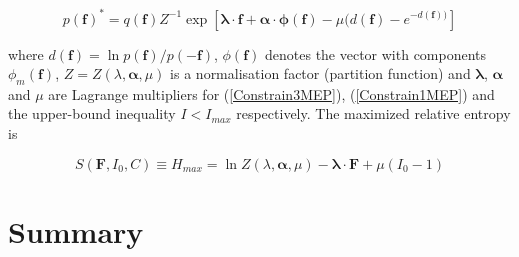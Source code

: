 \documentclass[a4paper,12pt]{article}
\begin{document}
\begin{equation}
  p(\bm{f})^* = q( \bm{f} ) Z^{-1} \exp[\bm{\lambda} \cdot \bm{f}+ \bm{\alpha} \cdot \bm{\phi} (\bm{f}) - \mu ( d(\bm{f}) - e^{-d(\bm{f}))}]
\end{equation}

where $d(\bm{f})= \ln{p(\bm{f})/p(-\bm{f})}$, $\phi(\bm{f})$ denotes the vector with components $\phi_m(\bm{f})$, $Z = Z(\lambda, \bm{\alpha},\mu)$ is a normalisation factor (partition function) and $\bm{\lambda}$, $\bm{\alpha}$ and $\mu$ are Lagrange multipliers for (\ref{Constrain3MEP}), (\ref{Constrain1MEP}) and the upper-bound inequality $I<I_{max}$ respectively. The maximized relative entropy is

\begin{equation}
  S(\bm{F}, I_0, C) \equiv H_{max} = \ln Z(\lambda, \bm{\alpha}, \mu) - \bm{\lambda} \cdot \bm{F} + \mu(I_0 -1)
\end{equation}

\section{Summary}



\newpage



\end{document}

